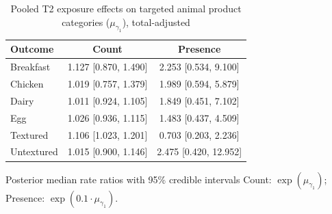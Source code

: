 \begin{table}[H]
\centering
\caption{Pooled T2 exposure effects on targeted animal product categories ($\mu_{\gamma_1}$), total-adjusted}
\label{tab:a2_t2_mu_gamma_adj}
\begin{tabular}{lcc}
\toprule
Outcome & Count & Presence \\
\midrule
Breakfast & 1.127 [0.870, 1.490] & 2.253 [0.534, 9.100] \\
Chicken & 1.019 [0.757, 1.379] & 1.989 [0.594, 5.879] \\
Dairy & 1.011 [0.924, 1.105] & 1.849 [0.451, 7.102] \\
Egg & 1.026 [0.936, 1.115] & 1.483 [0.437, 4.509] \\
Textured & 1.106 [1.023, 1.201] & 0.703 [0.203, 2.236] \\
Untextured & 1.015 [0.900, 1.146] & 2.475 [0.420, 12.952] \\
\bottomrule
\end{tabular}
\par\smallskip\footnotesize Posterior median rate ratios with 95\% credible intervals Count: $\exp(\mu_{\gamma_1})$; Presence: $\exp(0.1 \cdot \mu_{\gamma_1})$.
\end{table}

